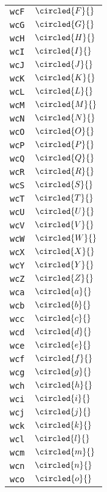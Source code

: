 \begin{longtable}{ll}
\texttt{wcF}&${}\circled{F}{}$\\
\texttt{wcG}&${}\circled{G}{}$\\
\texttt{wcH}&${}\circled{H}{}$\\
\texttt{wcI}&${}\circled{I}{}$\\
\texttt{wcJ}&${}\circled{J}{}$\\
\texttt{wcK}&${}\circled{K}{}$\\
\texttt{wcL}&${}\circled{L}{}$\\
\texttt{wcM}&${}\circled{M}{}$\\
\texttt{wcN}&${}\circled{N}{}$\\
\texttt{wcO}&${}\circled{O}{}$\\
\texttt{wcP}&${}\circled{P}{}$\\
\texttt{wcQ}&${}\circled{Q}{}$\\
\texttt{wcR}&${}\circled{R}{}$\\
\texttt{wcS}&${}\circled{S}{}$\\
\texttt{wcT}&${}\circled{T}{}$\\
\texttt{wcU}&${}\circled{U}{}$\\
\texttt{wcV}&${}\circled{V}{}$\\
\texttt{wcW}&${}\circled{W}{}$\\
\texttt{wcX}&${}\circled{X}{}$\\
\texttt{wcY}&${}\circled{Y}{}$\\
\texttt{wcZ}&${}\circled{Z}{}$\\
\texttt{wca}&${}\circled{a}{}$\\
\texttt{wcb}&${}\circled{b}{}$\\
\texttt{wcc}&${}\circled{c}{}$\\
\texttt{wcd}&${}\circled{d}{}$\\
\texttt{wce}&${}\circled{e}{}$\\
\texttt{wcf}&${}\circled{f}{}$\\
\texttt{wcg}&${}\circled{g}{}$\\
\texttt{wch}&${}\circled{h}{}$\\
\texttt{wci}&${}\circled{i}{}$\\
\texttt{wcj}&${}\circled{j}{}$\\
\texttt{wck}&${}\circled{k}{}$\\
\texttt{wcl}&${}\circled{l}{}$\\
\texttt{wcm}&${}\circled{m}{}$\\
\texttt{wcn}&${}\circled{n}{}$\\
\texttt{wco}&${}\circled{o}{}$\\

\end{longtable}
